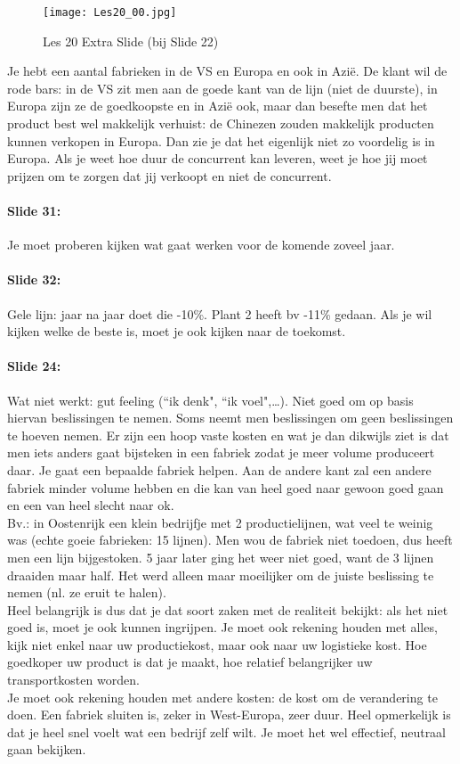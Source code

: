 \documentclass[10pt,a4paper]{report}
\begin{document}
\begin{figure}[h!]
\centering
\texttt{[image: Les20\_00.jpg]}
\caption{Les 20 Extra Slide (bij Slide 22)} 
\label{les20_00}
\end{figure}

Je hebt een aantal fabrieken in de VS en Europa en ook in Azi\"e. De klant wil de rode bars: in de VS zit men aan de goede kant van de lijn (niet de duurste), in Europa zijn ze de goedkoopste en in Azi\"e ook, maar dan besefte men dat het product best wel makkelijk verhuist: de Chinezen zouden makkelijk producten kunnen verkopen in Europa. Dan zie je dat het eigenlijk niet zo voordelig is in Europa. Als je weet hoe duur de concurrent kan leveren, weet je hoe jij moet prijzen om te zorgen dat jij verkoopt en niet de concurrent.

\paragraph{Slide 31:} Je moet proberen kijken wat gaat werken voor de komende zoveel jaar. 

\paragraph{Slide 32:} Gele lijn: jaar na jaar doet die -10\%. Plant 2 heeft bv -11\% gedaan. Als je wil kijken welke de beste is, moet je ook kijken naar de toekomst.

\paragraph{Slide 24:} Wat niet werkt: gut feeling (``ik denk", ``ik voel",…). Niet goed om op basis hiervan beslissingen te nemen. Soms neemt men beslissingen om geen beslissingen te hoeven nemen. Er zijn een hoop vaste kosten en wat je dan dikwijls ziet is dat men iets anders gaat bijsteken in een fabriek zodat je meer volume produceert daar. Je gaat een bepaalde fabriek helpen. Aan de andere kant zal een andere fabriek minder volume hebben en die kan van heel goed naar gewoon goed gaan en een van heel slecht naar ok. \\
Bv.: in Oostenrijk een klein bedrijfje met 2 productielijnen, wat veel te weinig was (echte goeie fabrieken: 15 lijnen). Men wou de fabriek niet toedoen, dus heeft men een lijn bijgestoken. 5 jaar later ging het weer niet goed, want de 3 lijnen draaiden maar half. Het werd alleen maar moeilijker om de juiste beslissing te nemen (nl. ze eruit te halen). \\
Heel belangrijk is dus dat je dat soort zaken met de realiteit bekijkt: als het niet goed is, moet je ook kunnen ingrijpen. Je moet ook rekening houden met alles, kijk niet enkel naar uw productiekost, maar ook naar uw logistieke kost. Hoe goedkoper uw product is dat je maakt, hoe relatief belangrijker uw transportkosten worden.\\
Je moet ook rekening houden met andere kosten: de kost om de verandering te doen. Een fabriek sluiten is, zeker in West-Europa, zeer duur. Heel opmerkelijk is dat je heel snel voelt wat een bedrijf zelf wilt. Je moet het wel effectief, neutraal gaan bekijken.
\end{document}
